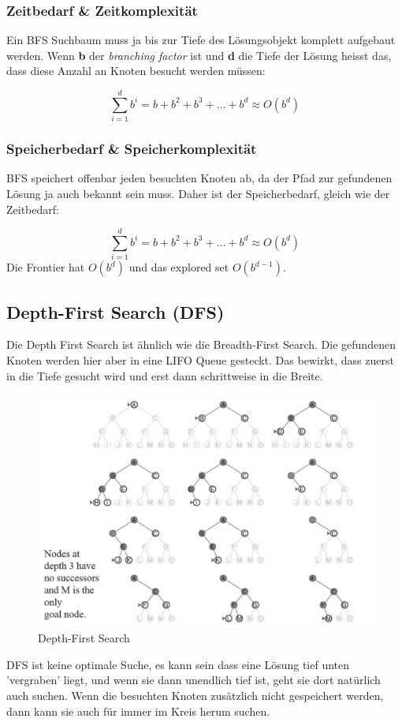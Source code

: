 \subsubsection{Zeitbedarf \& Zeitkomplexität}
Ein BFS Suchbaum muss ja bis zur Tiefe des Lösungsobjekt komplett aufgebaut werden. Wenn \textbf{b} der \textit{branching factor} ist und \textbf{d} die Tiefe der Lösung heisst das, dass diese Anzahl an Knoten besucht werden müssen:

\begin{displaymath}
	\displaystyle\sum_{i=1}^{d} b^i = b + b^2 + b^3 + \dots + b^d \approx O(b^d)
\end{displaymath}

\subsubsection{Speicherbedarf \& Speicherkomplexität}
BFS speichert offenbar jeden besuchten Knoten ab, da der Pfad zur gefundenen Lösung ja auch bekannt sein muss. Daher ist der Speicherbedarf, gleich wie der Zeitbedarf:

\begin{displaymath}
\displaystyle\sum_{i=1}^{d} b^i = b + b^2 + b^3 + \dots + b^d \approx O(b^d)
\end{displaymath}
Die Frontier hat \(O(b^d)\) und das explored set \(O(b^{d-1})\).

\subsection{Depth-First Search (DFS)}
Die Depth First Search ist ähnlich wie die Breadth-First Search. Die gefundenen Knoten werden hier aber in eine LIFO Queue gesteckt. Das bewirkt, dass zuerst in die Tiefe gesucht wird und erst dann schrittweise in die Breite.
\begin{figure} [h!]
	\centering
	\includegraphics[width=0.7\linewidth]{fig/dfs_search}
	\caption{Depth-First Search}
	\label{fig:dfs}
\end{figure}
DFS ist keine optimale Suche, es kann sein dass eine Lösung tief unten 'vergraben' liegt, und wenn sie dann unendlich tief ist, geht sie dort natürlich auch suchen. Wenn die besuchten Knoten zusätzlich nicht gespeichert werden, dann kann sie auch für immer im Kreis herum suchen.
